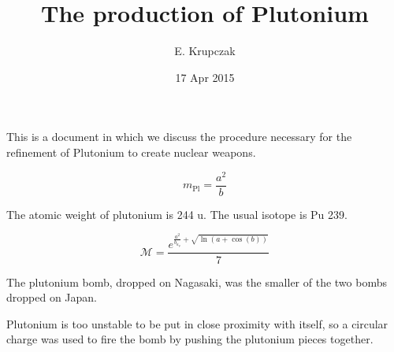 \documentclass{article}
\title{The production of Plutonium}
\date{17 Apr 2015}
\author{E. Krupczak}
\begin{document}
\maketitle

This is a document in which we discuss the procedure necessary for the refinement of Plutonium to create nuclear weapons.

$$m_\text{Pl} = \frac{a^2}{b}$$

The atomic weight of plutonium is 244 u. The usual isotope is Pu 239. 

$$\mathscr{M} = \frac{e^{\frac{a^2}{b_{a_y}} + \sqrt{\ln(a +
      \cos(b))}}}{7}$$

The plutonium bomb, dropped on Nagasaki, was the smaller of the two
bombs dropped on Japan. 

Plutonium is too unstable to be put in close proximity with itself, so
a circular charge was used to fire the bomb by pushing the plutonium
pieces together. 
\end{document}
